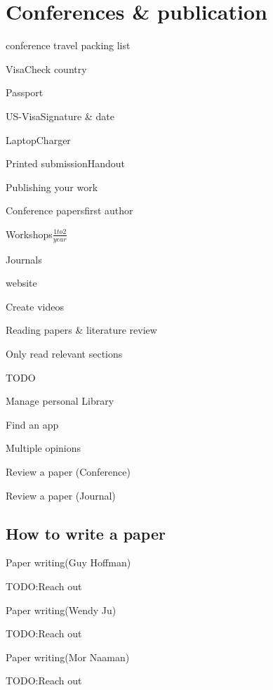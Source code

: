 \section{Conferences \& publication}

\begin{checklist}{conference travel packing list}
\item{Visa}{Check country}
\item{Passport}{}
\item{US-Visa}{Signature \& date}
\item{Laptop}{Charger}
\item{Printed submission}{Handout}

\end{checklist}

\begin{checklist}{Publishing your work}
\item{Conference papers}{first author}
\item{Workshops}{$\frac{1 to 2}{year} $}
\item{Journals}{}
\item{website}{}
\item{Create videos}{}
\end{checklist}

\begin{checklist}{Reading papers \& literature review}
\item{Only read relevant sections}{}
\item{TODO}{}
\end{checklist}

\begin{checklist}{Manage personal Library}
\item{Find an app}{}
\item{Multiple opinions}{}
\end{checklist}

\begin{checklist}{Review a paper (Conference)}
\item{}{}
\item{}{}
\end{checklist}

\begin{checklist}{Review a paper (Journal)}
\item{}{}
\item{}{}
\end{checklist}

\subsection{How to write a paper}
\begin{checklist}{Paper writing(Guy Hoffman)}
\item{TODO:}{Reach out}
\end{checklist}
\begin{checklist}{Paper writing(Wendy Ju)}
\item{TODO:}{Reach out}
\end{checklist}

\begin{checklist}{Paper writing(Mor Naaman)}
\item{TODO:}{Reach out}
\end{checklist}